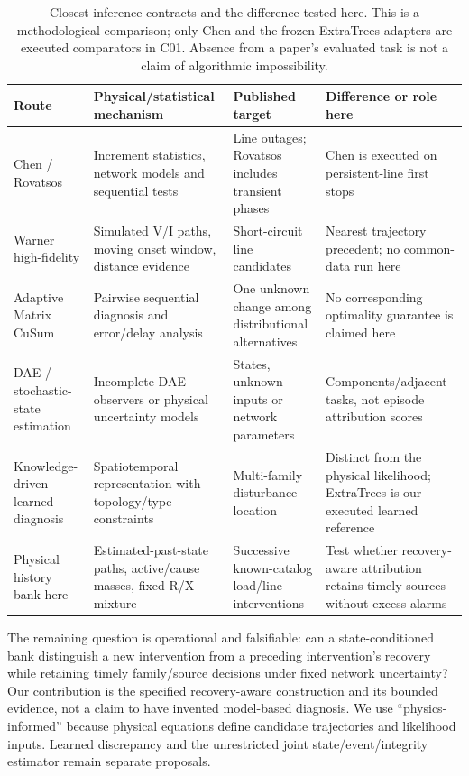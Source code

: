 \begin{table}[t]\centering\small
\caption{Closest inference contracts and the difference tested here. This is a methodological comparison; only Chen and the frozen ExtraTrees adapters are executed comparators in C01. Absence from a paper's evaluated task is not a claim of algorithmic impossibility.}\label{tab:literature-capability}
\begin{tabularx}{\textwidth}{@{}lXXX@{}}\toprule
Route & Physical/statistical mechanism & Published target & Difference or role here\\\midrule
Chen / Rovatsos & Increment statistics, network models and sequential tests & Line outages; Rovatsos includes transient phases & Chen is executed on persistent-line first stops\\
Warner high-fidelity & Simulated V/I paths, moving onset window, distance evidence & Short-circuit line candidates & Nearest trajectory precedent; no common-data run here\\
Adaptive Matrix CuSum & Pairwise sequential diagnosis and error/delay analysis & One unknown change among distributional alternatives & No corresponding optimality guarantee is claimed here\\
DAE / stochastic-state estimation & Incomplete DAE observers or physical uncertainty models & States, unknown inputs or network parameters & Components/adjacent tasks, not episode attribution scores\\
Knowledge-driven learned diagnosis & Spatiotemporal representation with topology/type constraints & Multi-family disturbance location & Distinct from the physical likelihood; ExtraTrees is our executed learned reference\\
Physical history bank here & Estimated-past-state paths, active/cause masses, fixed R/X mixture & Successive known-catalog load/line interventions & Test whether recovery-aware attribution retains timely sources without excess alarms\\\bottomrule
\end{tabularx}\end{table}

The remaining question is operational and falsifiable: can a state-conditioned bank distinguish a new intervention from a preceding intervention's recovery while retaining timely family/source decisions under fixed network uncertainty? Our contribution is the specified recovery-aware construction and its bounded evidence, not a claim to have invented model-based diagnosis. We use ``physics-informed'' because physical equations define candidate trajectories and likelihood inputs. Learned discrepancy and the unrestricted joint state/event/integrity estimator remain separate proposals.
